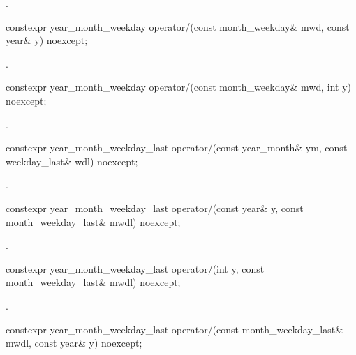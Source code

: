 \begin{itemdescr}
\pnum
\returns
{}.
\end{itemdescr}

\begin{itemdecl}
constexpr year_month_weekday
  operator/(const month_weekday& mwd, const year& y) noexcept;
\end{itemdecl}

\begin{itemdescr}
\pnum
\returns
{}.
\end{itemdescr}

\begin{itemdecl}
constexpr year_month_weekday
  operator/(const month_weekday& mwd, int y) noexcept;
\end{itemdecl}

\begin{itemdescr}
\pnum
\returns
{}.
\end{itemdescr}

\begin{itemdecl}
constexpr year_month_weekday_last
  operator/(const year_month& ym, const weekday_last& wdl) noexcept;
\end{itemdecl}

\begin{itemdescr}
\pnum
\returns
{}.
\end{itemdescr}

\begin{itemdecl}
constexpr year_month_weekday_last
  operator/(const year& y, const month_weekday_last& mwdl) noexcept;
\end{itemdecl}

\begin{itemdescr}
\pnum
\returns
{}.
\end{itemdescr}

\begin{itemdecl}
constexpr year_month_weekday_last
  operator/(int y, const month_weekday_last& mwdl) noexcept;
\end{itemdecl}

\begin{itemdescr}
\pnum
\returns
{}.
\end{itemdescr}

\begin{itemdecl}
constexpr year_month_weekday_last
  operator/(const month_weekday_last& mwdl, const year& y) noexcept;
\end{itemdecl}


